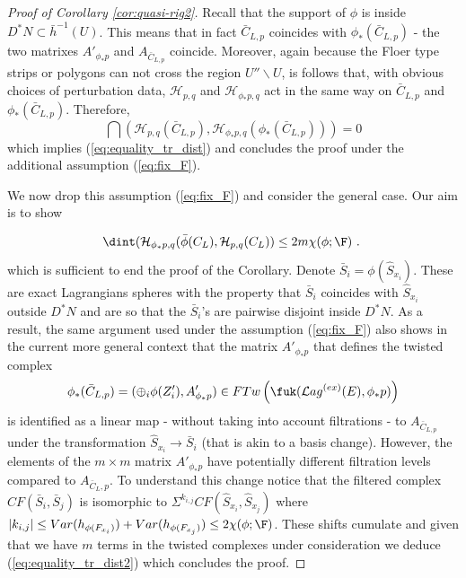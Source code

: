 \begin{proof}[Proof of Corollary \ref{cor:quasi-rig2}]
Recall that the support of $\phi$ is inside $D^{\ast}N\subset \bar{h}^{-1}(U)$. This means
that in fact $\bar{C}_{L,p}$ coincides with $\phi_{\ast}(\bar{C}_{L,p})$ - the two matrixes $A'_{\phi_{\ast}p}$ and $A_{\bar{C}_{L,p}}$ coincide. Moreover, 
again because the Floer type strips or polygons can not cross the region $U''\backslash U$,
is follows that, with obvious choices of perturbation data,  $\mathcal{H}_{p,q}$ and $\mathcal{H}_{\phi_{\ast}p,q}$ act in the same way on $\bar{C}_{L,p}$ and $\phi_{\ast}(\bar{C}_{L,p})$. 
Therefore,
$$\dint (\mathcal{H}_{p,q}(\bar{C}_{L,p}), \mathcal{H}_{\phi_{\ast}p, q}(\phi_{\ast}(\bar{C}_{L,p})))=0$$
which implies  (\ref{eq:equality_tr_dist}) and concludes the proof under the additional assumption (\ref{eq:fix_F}).



We now drop this assumption (\ref{eq:fix_F}) and consider the general case. Our aim is to show

\begin{equation}\label{eq:equality_tr_dist2}
\dint (\mathcal{H}_{\phi_{\ast}p, q}(\bar{\phi}(C_{L}), \mathcal{H}_{p,q}(C_{L}))\leq 
2m \chi(\phi;\F)~.~
 \end{equation}
which is sufficient to end the proof of the Corollary.
Denote $\bar{S}_{i}=\phi(\hat{S}_{x_{i}})$. These are exact Lagrangians spheres with the 
property that $\bar{S}_{i}$ coincides with $\hat{S}_{x_{i}}$ outside $D^{\ast}N$ and are so that the $\bar{S}_{i}$'s are pairwise disjoint inside $D^{\ast}N$. 
As a result, the same argument used under the assumption (\ref{eq:fix_F}) also
shows in the current more general context that the matrix $A'_{\phi_{\ast}p}$ that defines the twisted complex 
$$\phi_{\ast}(\bar{C}_{L,p})=(\oplus_{i}\phi(Z'_{i}), A'_{\phi_{\ast}p})\in FTw\left(\fuk(\mathcal{L}ag^{(ex)}(E), \phi_{\ast}p ) \right ) $$
is identified as a linear map - without taking into account filtrations - 
to $A_{\bar{C}_{L,p}}$ under the transformation $\hat{S}_{x_{i}}\to \bar{S}_{i}$ (that is akin to a basis change). However, the elements of the $m \times m$ matrix $A'_{\phi_{\ast}p}$ have potentially different filtration levels compared to  $A_{\bar{C}_{L},p}$. To understand this change 
notice that the filtered complex $CF(\bar{S}_{i}, \bar{S}_{j})$ is isomorphic to
$\Sigma^{k_{i,j}}CF (\hat{S}_{x_{i}}, \hat{S}_{x_{j}})$ where $|k_{i,j}|\leq Var(h_{\phi(F_{x_{i}})}) +Var(h_{\phi(F_{x_{j}})}) \leq 2\chi(\phi;\F)$. These shifts cumulate and given that we have $m$ terms in the twisted complexes under consideration we deduce (\ref{eq:equality_tr_dist2}) which concludes the proof.
\end{proof}



